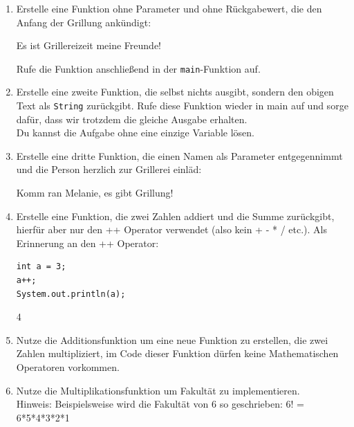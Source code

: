 \documentclass{../../sheet}
\begin{document}
\newpage


\begin{enumerate}
    \item Erstelle eine Funktion ohne Parameter und ohne Rückgabewert, die den Anfang der Grillung ankündigt:
          \begin{ausgabe}
              Es ist Grillereizeit meine Freunde!
          \end{ausgabe}
          Rufe die Funktion anschließend in der \texttt{main}-Funktion auf.
    \item Erstelle eine zweite Funktion, die selbst nichts ausgibt, sondern den obigen Text als \texttt{String} zurückgibt. Rufe diese Funktion wieder in main auf und sorge dafür, dass wir trotzdem die gleiche Ausgabe erhalten.\\ Du kannst die Aufgabe ohne eine einzige Variable lösen.
    \item Erstelle eine dritte Funktion, die einen Namen als Parameter entgegennimmt und die Person herzlich zur Grillerei einläd:
          \begin{ausgabe}
              Komm ran Melanie, es gibt Grillung!
          \end{ausgabe}
    \item Erstelle eine Funktion, die zwei Zahlen addiert und die Summe zurückgibt, hierfür aber nur den ++ Operator verwendet (also kein + - * / etc.). Als Erinnerung an den ++ Operator:
          \begin{verbatim}
int a = 3;
a++;
System.out.println(a);
    \end{verbatim}
          \begin{ausgabe}
              4
          \end{ausgabe}
    \item Nutze die Additionsfunktion um eine neue Funktion zu erstellen, die zwei Zahlen multipliziert, im Code dieser Funktion dürfen keine Mathematischen Operatoren vorkommen.
    \item Nutze die Multiplikationsfunktion um Fakultät zu implementieren.\\
          Hinweis: Beispielsweise wird die Fakultät von 6 so geschrieben: 6! = 6*5*4*3*2*1
\end{enumerate}

\newpage
{}
\end{document}
